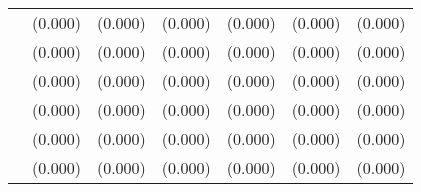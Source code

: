 \begin{table}[htbp]
\begin{tabular}{l*{6}{c}}
                    &     (0.000)         &     (0.000)         &     (0.000)         &     (0.000)         &     (0.000)         &     (0.000)         \\
                    &     (0.000)         &     (0.000)         &     (0.000)         &     (0.000)         &     (0.000)         &     (0.000)         \\
                    &     (0.000)         &     (0.000)         &     (0.000)         &     (0.000)         &     (0.000)         &     (0.000)         \\
                    &     (0.000)         &     (0.000)         &     (0.000)         &     (0.000)         &     (0.000)         &     (0.000)         \\
                    &     (0.000)         &     (0.000)         &     (0.000)         &     (0.000)         &     (0.000)         &     (0.000)         \\
                    &     (0.000)         &     (0.000)         &     (0.000)         &     (0.000)         &     (0.000)         &     (0.000)         \\

\end{tabular}
\end{table}

